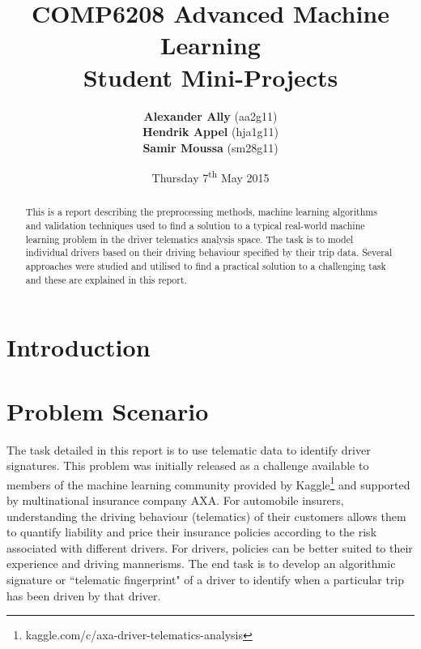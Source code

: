 \documentclass[a4paper, 11pt, twocolumn]{report}
\begin{document}
\lstset{language=Matlab, basicstyle=\small}
\title{\textbf{COMP6208 Advanced Machine Learning} \\
{\Large Student Mini-Projects}}

\author{\textbf{Alexander Ally} (aa2g11)\\
\textbf{Hendrik Appel} (hja1g11)\\
\textbf{Samir Moussa} (sm28g11)}

\date{Thursday 7\textsuperscript{th} May 2015}
\maketitle

\begin{abstract}

This is a report describing the preprocessing methods, machine learning algorithms and validation techniques used to find a solution to a typical real-world machine learning problem in the driver telematics analysis space.
The task is to model individual drivers based on their driving behaviour specified by their trip data.
Several approaches were studied and utilised to find a practical solution to a challenging task and these are explained in this report.

\end{abstract}

\section{Introduction}





\section{Problem Scenario}

The task detailed in this report is to use telematic data to identify driver signatures.
This problem was initially released as a challenge available to members of the machine learning community provided by Kaggle\footnote{kaggle.com/c/axa-driver-telematics-analysis} and supported by multinational insurance company AXA.
For automobile insurers, understanding the driving behaviour (telematics) of their customers allows them to quantify liability and price their insurance policies according to the risk associated with different drivers.
For drivers, policies can be better suited to their experience and driving mannerisms.
The end task is to develop an algorithmic signature or ``telematic fingerprint" of a driver to identify when a particular trip has been driven by that driver.
\end{document}
